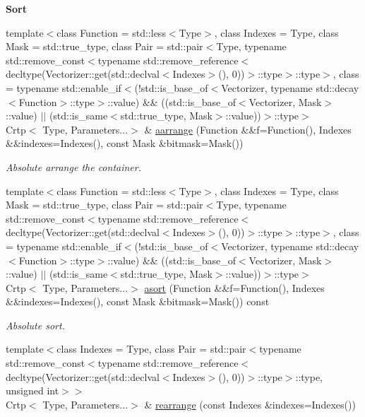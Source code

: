 \begin{Indent}{\bf Sort}
\begin{DoxyCompactItemize}
{\footnotesize template$<$class Function  = std\-::less$<$\-Type$>$, class Indexes  = Type, class Mask  = std\-::true\-\_\-type, class Pair  = std\-::pair$<$\-Type, typename std\-::remove\-\_\-const$<$typename std\-::remove\-\_\-reference$<$decltype(\-Vectorizer\-::get(std\-::declval$<$\-Indexes$>$(), 0))$>$\-::type$>$\-::type$>$, class  = typename std\-::enable\-\_\-if$<$(!std\-::is\-\_\-base\-\_\-of$<$\-Vectorizer, typename std\-::decay$<$\-Function$>$\-::type$>$\-::value) \&\& ((std\-::is\-\_\-base\-\_\-of$<$\-Vectorizer, Mask$>$\-::value) $|$$|$ (std\-::is\-\_\-same$<$std\-::true\-\_\-type, Mask$>$\-::value))$>$\-::type$>$ }\\Crtp$<$ Type, Parameters...$>$ \& \hyperlink{classmagrathea_1_1AbstractNArray_a389ab05c05a2d948ad2ba841c87478f4}{aarrange} (Function \&\&f=Function(), Indexes \&\&indexes=Indexes(), const Mask \&bitmask=Mask())
\begin{DoxyCompactList}\small\item\em Absolute arrange the container. \end{DoxyCompactList}\item 
{\footnotesize template$<$class Function  = std\-::less$<$\-Type$>$, class Indexes  = Type, class Mask  = std\-::true\-\_\-type, class Pair  = std\-::pair$<$\-Type, typename std\-::remove\-\_\-const$<$typename std\-::remove\-\_\-reference$<$decltype(\-Vectorizer\-::get(std\-::declval$<$\-Indexes$>$(), 0))$>$\-::type$>$\-::type$>$, class  = typename std\-::enable\-\_\-if$<$(!std\-::is\-\_\-base\-\_\-of$<$\-Vectorizer, typename std\-::decay$<$\-Function$>$\-::type$>$\-::value) \&\& ((std\-::is\-\_\-base\-\_\-of$<$\-Vectorizer, Mask$>$\-::value) $|$$|$ (std\-::is\-\_\-same$<$std\-::true\-\_\-type, Mask$>$\-::value))$>$\-::type$>$ }\\Crtp$<$ Type, Parameters...$>$ \hyperlink{classmagrathea_1_1AbstractNArray_ab631e198d51c8e6ef185fae3b25015aa}{asort} (Function \&\&f=Function(), Indexes \&\&indexes=Indexes(), const Mask \&bitmask=Mask()) const 
\begin{DoxyCompactList}\small\item\em Absolute sort. \end{DoxyCompactList}\item 
{\footnotesize template$<$class Indexes  = Type, class Pair  = std\-::pair$<$typename std\-::remove\-\_\-const$<$typename std\-::remove\-\_\-reference$<$decltype(\-Vectorizer\-::get(std\-::declval$<$\-Indexes$>$(), 0))$>$\-::type$>$\-::type, unsigned int$>$$>$ }\\Crtp$<$ Type, Parameters...$>$ \& \hyperlink{classmagrathea_1_1AbstractNArray_aac3ab908e44ea21f0956b519e1900f11}{rearrange} (const Indexes \&indexes=Indexes())

\end{DoxyCompactItemize}
\end{Indent}

